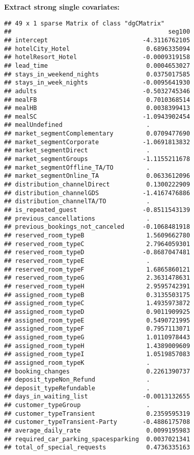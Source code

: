 \documentclass[
]{article}
\begin{document}
\textbf{Extract strong single covariates:}

\begin{verbatim}
## 49 x 1 sparse Matrix of class "dgCMatrix"
##                                           seg100
## intercept                          -4.3116762105
## hotelCity_Hotel                     0.6896335094
## hotelResort_Hotel                  -0.0009319158
## lead_time                           0.0004653027
## stays_in_weekend_nights             0.0375017585
## stays_in_week_nights               -0.0095641930
## adults                             -0.5032745346
## mealFB                              0.7010368514
## mealHB                              0.0038399413
## mealSC                             -1.0943902454
## mealUndefined                       .           
## market_segmentComplementary         0.0709477690
## market_segmentCorporate            -1.0691813832
## market_segmentDirect                .           
## market_segmentGroups               -1.1155211678
## market_segmentOffline_TA/TO         .           
## market_segmentOnline_TA             0.0633612096
## distribution_channelDirect          0.1300222909
## distribution_channelGDS            -1.4167476886
## distribution_channelTA/TO           .           
## is_repeated_guest                  -0.8511543139
## previous_cancellations              .           
## previous_bookings_not_canceled     -0.1068481918
## reserved_room_typeB                 1.5609662780
## reserved_room_typeC                 2.7964059301
## reserved_room_typeD                -0.8687047481
## reserved_room_typeE                 .           
## reserved_room_typeF                 1.6865860121
## reserved_room_typeG                 2.3631478631
## reserved_room_typeH                 2.9595742391
## assigned_room_typeB                 0.3135503175
## assigned_room_typeC                 1.4935973872
## assigned_room_typeD                 0.9011909925
## assigned_room_typeE                 0.5490721995
## assigned_room_typeF                 0.7957113071
## assigned_room_typeG                 1.0110978443
## assigned_room_typeH                 1.4389009609
## assigned_room_typeI                 1.0519857083
## assigned_room_typeK                 .           
## booking_changes                     0.2261390737
## deposit_typeNon_Refund              .           
## deposit_typeRefundable              .           
## days_in_waiting_list               -0.0013132655
## customer_typeGroup                  .           
## customer_typeTransient              0.2359595319
## customer_typeTransient-Party       -0.4886175708
## average_daily_rate                  0.0099195983
## required_car_parking_spacesparking  0.0037021341
## total_of_special_requests           0.4736335163
\end{verbatim}
\end{document}
